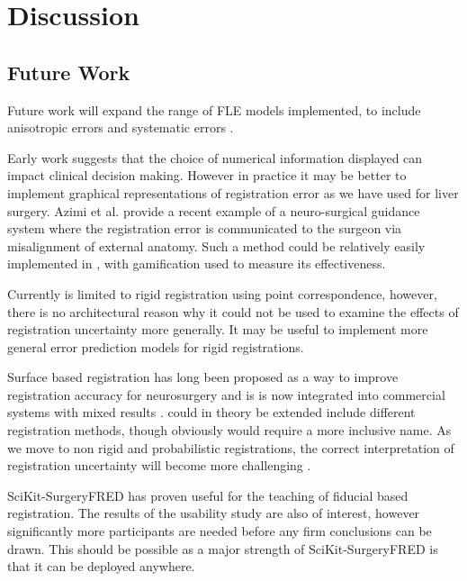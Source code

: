 \section{Discussion}
\subsection{Future Work}
Future work will expand the range of \gls{FLE} models implemented, to include anisotropic \cite{4359072} 
errors and systematic errors \cite{6294449}. 

Early work suggests that the choice of numerical information displayed can impact 
clinical decision making. However in practice it may be better to implement 
graphical representations of registration error as we have used for 
liver surgery\cite{PMID:29663273}. Azimi et al. \cite{10.1007/978-3-030-59716-0_7} 
provide a recent example of a neuro-surgical guidance system where the 
registration error is communicated to the surgeon via misalignment of 
external anatomy. Such a method could be relatively easily implemented in \fred, with
gamification used to measure its effectiveness. 

Currently \fred is limited to rigid registration using point correspondence, however, 
there is no architectural reason why it could not be used to examine the 
effects of registration uncertainty more generally. It may be useful to implement 
more general error prediction models for rigid registrations\cite{4359072,5629373}.

Surface based registration has long been proposed as a way to improve 
registration accuracy for neurosurgery \cite{736031} and is 
is now integrated into commercial systems with mixed results \cite{mongen2020}.
\fred could in 
theory be extended include different registration methods, though obviously would 
require a more inclusive name. As we move to non rigid and 
probabilistic registrations, the correct interpretation of registration 
uncertainty will become more challenging \cite{10.1007/978-3-030-59716-0_26}.

SciKit-SurgeryFRED has proven useful for the teaching of fiducial based registration. The results of the usability study 
are also of interest, however significantly more participants are needed before any firm conclusions can be drawn. This 
should be possible as a major strength of SciKit-SurgeryFRED is that it can be deployed anywhere. 








